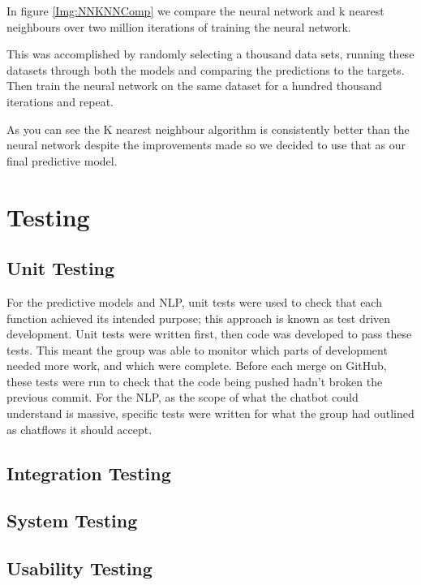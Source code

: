 \documentclass[11pt]{article}
\begin{document}
	In figure \ref{Img:NNKNNComp} we compare the neural network and k nearest neighbours over two million iterations of training the neural network.
	
	This was accomplished by randomly selecting a thousand data sets, running these datasets through both the models and comparing the predictions to the targets. Then train the neural network on the same dataset for a hundred thousand iterations and repeat.
	
	As you can see the K nearest neighbour algorithm is consistently better than the neural network despite the improvements made so we decided to use that as our final predictive model.
	
	\section{Testing} \label{Testing}
	
	\subsection{Unit Testing}
	For the predictive models and NLP, unit tests were used to check that each function achieved its intended purpose; this approach is known as test driven development. Unit tests were written first, then code was developed to pass these tests. This meant the group was able to monitor which parts of development needed more work, and which were complete. Before each merge on GitHub, these tests were run to check that the code being pushed hadn’t broken the previous commit. For the NLP, as the scope of what the chatbot could understand is massive, specific tests were written for what the group had outlined as chatflows it should accept. 
	
	
	\subsection{Integration Testing}
	
	\subsection{System Testing}
	
	\subsection{Usability Testing}
	
\end{document}
